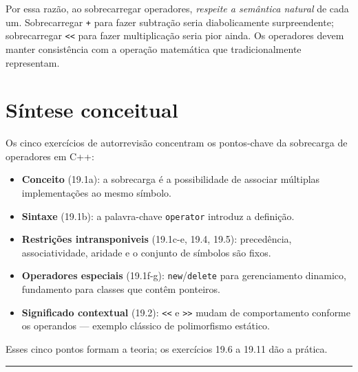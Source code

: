 \documentclass[11pt,a4paper]{article}
\begin{document}
\begin{boaprat}
Por essa raz\~ao, ao sobrecarregar operadores, \emph{respeite a sem\^antica natural} de cada um. Sobrecarregar \texttt{+} para fazer subtra\c{c}\~ao seria diabolicamente surpreendente; sobrecarregar \texttt{<<} para fazer multiplica\c{c}\~ao seria pior ainda. Os operadores devem manter consist\^encia com a opera\c{c}\~ao matem\'atica que tradicionalmente representam.
\end{boaprat}

\section*{S\'intese conceitual}

Os cinco exerc\'icios de autorrevisão concentram os pontos-chave da sobrecarga de operadores em C++:

\begin{itemize}[leftmargin=*,itemsep=0pt]
  \item \textbf{Conceito} (19.1a): a sobrecarga \'e a possibilidade de associar m\'ultiplas implementa\c{c}\~oes ao mesmo s\'imbolo.
  \item \textbf{Sintaxe} (19.1b): a palavra-chave \texttt{operator} introduz a defini\c{c}\~ao.
  \item \textbf{Restri\c{c}\~oes intransponiveis} (19.1c-e, 19.4, 19.5): preced\^encia, associatividade, aridade e o conjunto de s\'imbolos s\~ao fixos.
  \item \textbf{Operadores especiais} (19.1f-g): \texttt{new}/\texttt{delete} para gerenciamento dinamico, fundamento para classes que cont\^em ponteiros.
  \item \textbf{Significado contextual} (19.2): \texttt{<<} e \texttt{>>} mudam de comportamento conforme os operandos --- exemplo cl\'assico de polimorfismo est\'atico.
\end{itemize}

Esses cinco pontos formam a teoria; os exerc\'icios 19.6 a 19.11 d\~ao a pr\'atica.

\vspace{1em}
\begin{center}\rule{0.5\textwidth}{0.4pt}\end{center}
\end{document}
